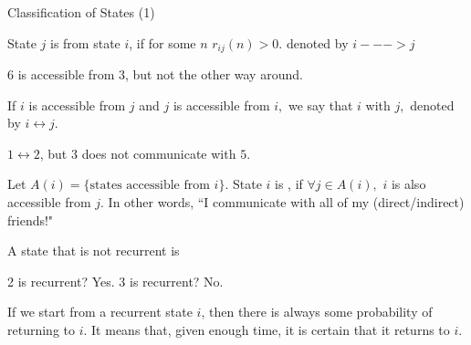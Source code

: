 \begin{frame}{Classification of States (1)}

{
\small
\plitemsep 0.05in
\bci
\item<2->  State $j$ is  from state $i$, if for
  some $n$ $r_{ij}(n) >0.$ denoted by $i ---> j$

  
\bci
\item<3-> 6 is accessible from 3, but not the other way around.  
\eci
\item<4->  If $i$ is accessible from $j$ and $j$ is accessible
  from $i,$ we say that $i$  with $j,$ denoted by
  $i \leftrightarrow j.$
\bci
\item<5-> $1 \leftrightarrow 2$, but $3$ does not communicate with $5.$
\eci
\eci
}
{
\vspace{-0.3cm}
\begin{center}
\end{center}
}

\small
\plitemsep 0.05in
\bci
 \item<6->  Let $A(i) = \{\text{states accessible from $i$} \}.$ State $i$ is , if 
 $\forall j \in A(i),$ $i$ is also accessible from $j.$  In other
 words, ``I communicate with all of my (direct/indirect) friends!"
\bci
  \item<7-> A state that is not recurrent is   
  \item<8-> 2 is recurrent? Yes. 3 is recurrent? No. 
 \item<9-> If we start from a recurrent state $i$, then there is always some probability of returning to $i.$ It means that, given enough time, it is certain that it returns to $i.$ 
\eci
\eci
\end{frame}

